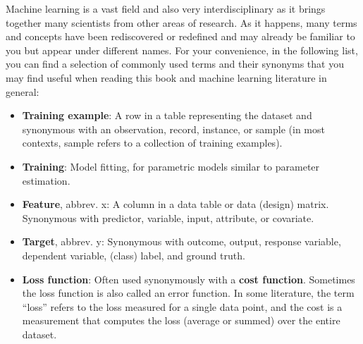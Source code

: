 \documentclass[11pt]{article}
\begin{document}
Machine learning is a vast field and also very interdisciplinary as it
brings together many scientists from other areas of research. As it
happens, many terms and concepts have been rediscovered or redefined and
may already be familiar to you but appear under different names. For
your convenience, in the following list, you can find a selection of
commonly used terms and their synonyms that you may find useful when
reading this book and machine learning literature in general:

\begin{itemize}
\item
  \textbf{Training example}: A row in a table representing the dataset
  and synonymous with an observation, record, instance, or sample (in
  most contexts, sample refers to a collection of training examples).
\item
  \textbf{Training}: Model fitting, for parametric models similar to
  parameter estimation.
\item
  \textbf{Feature}, abbrev. x: A column in a data table or data (design)
  matrix. Synonymous with predictor, variable, input, attribute, or
  covariate.
\item
  \textbf{Target}, abbrev. y: Synonymous with outcome, output, response
  variable, dependent variable, (class) label, and ground truth.
\item
  \textbf{Loss function}: Often used synonymously with a \textbf{cost
  function}. Sometimes the loss function is also called an error
  function. In some literature, the term ``loss'' refers to the loss
  measured for a single data point, and the cost is a measurement that
  computes the loss (average or summed) over the entire dataset.
\end{itemize}


    
    
    
\end{document}
